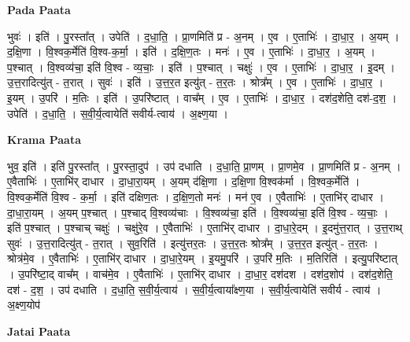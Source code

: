 \documentclass[17pt]{extarticle}
\begin{document}
\textbf{Pada Paata} \newline

भुवः॑ । इति॑ । पु॒रस्ता᳚त् । उपेति॑ । द॒धा॒ति॒ । प्रा॒णमिति॑ प्र - अ॒नम् । ए॒व । ए॒ताभिः॑ । दा॒धा॒र॒ । अ॒यम् । द॒क्षि॒णा । वि॒श्वक॒र्मेति॑ वि॒श्व-क॒र्मा॒ । इति॑ । द॒क्षि॒ण॒तः । मनः॑ । ए॒व । ए॒ताभिः॑ । दा॒धा॒र॒ । अ॒यम् । प॒श्चात् । वि॒श्वव्य॑चा॒ इति॑ वि॒श्व - व्य॒चाः॒ । इति॑ । प॒श्चात् । चक्षुः॑ । ए॒व । ए॒ताभिः॑ । दा॒धा॒र॒ । इ॒दम् । उ॒त्त॒रादित्यु॑त् - त॒रात् । सुवः॑ । इति॑ । उ॒त्त॒र॒त इत्यु॑त् - त॒र॒तः । श्रोत्र᳚म् । ए॒व । ए॒ताभिः॑ । दा॒धा॒र॒ । इ॒यम् । उ॒परि॑ । म॒तिः । इति॑ । उ॒परि॑ष्टात् । वाच᳚म् । ए॒व । ए॒ताभिः॑ । दा॒धा॒र॒ । दश॑द॒शेति॒ दश॑-द॒श॒ । उपेति॑ । द॒धा॒ति॒ । स॒वी॒र्य॒त्वायेति॑ सवीर्य-त्वाय॑ । अ॒क्ष्ण॒या ।  \newline


\textbf{Krama Paata} \newline

भुव॒ इति॑ । इति॑ पु॒रस्ता᳚त् । पु॒रस्ता॒दुप॑ । उप॑ दधाति । द॒धा॒ति॒ प्रा॒णम् । प्रा॒णमे॒व । प्रा॒णमिति॑ प्र - अ॒नम् । ए॒वैताभिः॑ । ए॒ताभि॑र् दाधार । दा॒धा॒रा॒यम् । अ॒यम् द॑क्षि॒णा । द॒क्षि॒णा वि॒श्वक॑र्मा । वि॒श्वक॒र्मेति॑ । वि॒श्वक॒र्मेति॑ वि॒श्व - क॒र्मा॒ । इति॑ दक्षिण॒तः । द॒क्षि॒ण॒तो मनः॑ । मन॑ ए॒व । ए॒वैताभिः॑ । ए॒ताभि॑र् दाधार । दा॒धा॒रा॒यम् । अ॒यम् प॒श्चात् । प॒श्चाद् वि॒श्वव्य॑चाः । वि॒श्वव्य॑चा॒ इति॑ । वि॒श्वव्य॑चा॒ इति॑ वि॒श्व - व्य॒चाः॒ । इति॑ प॒श्चात् । प॒श्चाच् चक्षुः॑ । चक्षु॑रे॒व । ए॒वैताभिः॑ । ए॒ताभि॑र् दाधार । दा॒धा॒रे॒दम् । इ॒दमु॑त्त॒रात् । उ॒त्त॒राथ् सुवः॑ । उ॒त्त॒रादित्यु॑त् - त॒रात् । सुव॒रिति॑ । इत्यु॑त्तर॒तः । उ॒त्त॒र॒तः श्रोत्र᳚म् । उ॒त्त॒र॒त इत्यु॑त् - त॒र॒तः । श्रोत्र॑मे॒व । ए॒वैताभिः॑ । ए॒ताभि॑र् दाधार । दा॒धा॒रे॒यम् । इ॒यमु॒परि॑ । उ॒परि॑ म॒तिः । म॒तिरिति॑ । इत्यु॒परि॑ष्टात् । उ॒परि॑ष्टा॒द् वाच᳚म् । वाच॑मे॒व । ए॒वैताभिः॑ । ए॒ताभि॑र् दाधार । दा॒धा॒र॒ दश॑दश । दश॑द॒शोप॑ । दश॑द॒शेति॒ दश॑ - द॒श॒ । 
उप॑ दधाति । द॒धा॒ति॒ स॒वी॒र्य॒त्वाय॑ । स॒वी॒र्य॒त्वाया᳚क्ष्ण॒या । स॒वी॒र्य॒त्वायेति॑ सवीर्य - त्वाय॑ । अ॒क्ष्ण॒योप॑ \newline

\textbf{Jatai Paata} \newline
\end{document}
